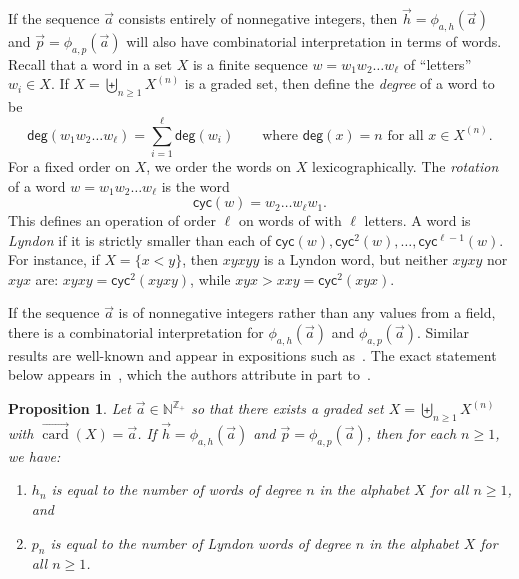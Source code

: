 \documentclass[11pt]{amsart}
\newtheorem{proposition}[theorem]{Proposition}
\theoremstyle{definition}
\numberwithin{equation}{section}
\def\NN{{\mathbb N}}
\def\ZZ{{\mathbb Z}}
\newcommand{\veccard}{\overrightarrow{\operatorname{card}}}
\begin{document}
If the sequence $\vec{a}$ consists entirely of nonnegative integers,
then $\vec{h} = \phi_{a, h}(\vec{a})$ and $\vec{p} = \phi_{a, p}(\vec{a})$ will also have combinatorial interpretation in terms of words.
Recall that a word in a set $X$ is a finite sequence $w = w_{1} w_{2} \ldots w_{\ell}$ of ``letters'' $w_{i} \in X$.  
If $X = \biguplus_{n \geq 1} X^{(n)}$ is a graded set, then define the \emph{degree} of a word to be
\[
\mathsf{deg}(w_1 w_2 \ldots w_{\ell}) = \sum_{i = 1}^{\ell} \mathsf{deg}(w_{i})
\qquad\text{where $\mathsf{deg}(x) = n$ for all $x \in X^{(n)}$}.
\]
For a fixed order on $X$, we order the words on $X$ lexicographically.  
The \emph{rotation} of a word $w = w_{1} w_{2} \ldots w_{\ell}$ is the word
\[
\mathsf{cyc}(w) =  w_{2} \ldots w_{\ell} w_{1}.
\]
This defines an operation of order $\ell$ on words of with $\ell$ letters.  
A word is \emph{Lyndon} if it is strictly smaller than each of $\mathsf{cyc}(w), \mathsf{cyc}^{2}(w), \ldots, \mathsf{cyc}^{\ell-1}(w)$.  
For instance, if $X = \{x < y\}$, then $xyxyy$ is a Lyndon word, but neither $xyxy$ nor $xyx$ are: $xyxy = \mathsf{cyc}^{2}(xyxy)$, while $xyx > xxy = \mathsf{cyc}^{2}(xyx)$.

If the sequence $\vec{a}$ is of nonnegative integers rather than
any values from a field, there is a combinatorial interpretation for
$\phi_{a, h}(\vec{a})$ and $\phi_{a, p}(\vec{a})$.
Similar results are well-known and appear in expositions such as~\cite[Chapter 5]{Reutenauer-FreeLieAlgebras}.  
The exact statement below appears in~\cite[p.~566]{AL15}, which the authors attribute in part to~\cite{KK95}.

\begin{proposition}
\label{prop:combinatorialinterpretation}
Let $\vec{a} \in \NN^{\ZZ_+}$ so that there exists a graded set $X = \biguplus_{n \geq 1} X^{(n)}$ with $\veccard(X) = \vec{a}$.
If $\vec{h} = \phi_{a, h}(\vec{a})$ and $\vec{p} = \phi_{a, p}(\vec{a})$, then for each $n \geq 1$, we have:
\begin{enumerate}[itemsep = 0.5em]
\item $h_n$ is equal to the number of words of degree $n$ in the alphabet $X$ for all $n \ge 1$, and 

\item $p_n$ is equal to the number of Lyndon words of degree $n$ in the alphabet $X$ for all $n \ge 1$.
\end{enumerate}
\end{proposition}
\end{document}
